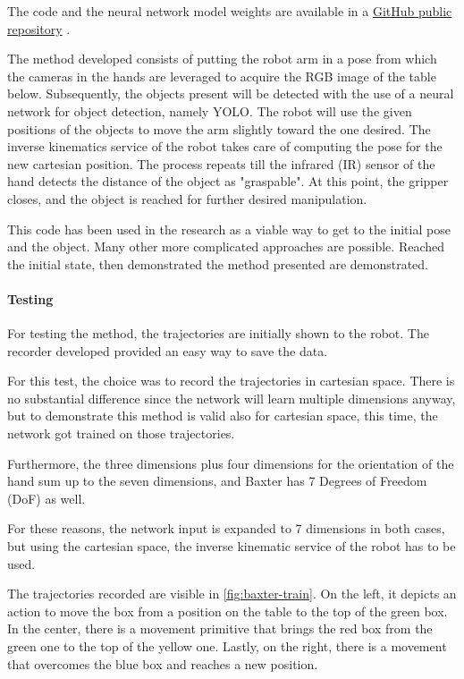 The code and the neural network model weights are available in a \href{https://github.com/igor-lirussi/Baxter-Robot-ObjDet}{GitHub public repository} \cite{url:BaxterrepoObjDet}.

The method developed consists of putting the robot arm in a pose from which the cameras in the hands are leveraged to acquire the RGB image of the table below. Subsequently, the objects present will be detected with the use of a neural network for object detection, namely YOLO. The robot will use the given positions of the objects to move the arm slightly toward the one desired. The inverse kinematics service of the robot takes care of computing the pose for the new cartesian position. The process repeats till the infrared (IR) sensor of the hand detects the distance of the object as "graspable". At this point, the gripper closes, and the object is reached for further desired manipulation.

This code has been used in the research as a viable way to get to the initial pose and the object. Many other more complicated approaches are possible. Reached the initial state, then demonstrated the method presented are demonstrated.   


\paragraph{Testing}
For testing the method, the trajectories are initially shown to the robot. The recorder developed provided an easy way to save the data. 

For this test, the choice was to record the trajectories in cartesian space. There is no substantial difference since the network will learn multiple dimensions anyway, but to demonstrate this method is valid also for cartesian space, this time, the network got trained on those trajectories. 

Furthermore, the three dimensions plus four dimensions for the orientation of the hand sum up to the seven dimensions, and Baxter has 7 Degrees of Freedom (DoF) as well. 

For these reasons, the network input is expanded to 7 dimensions in both cases, but using the cartesian space, the inverse kinematic service of the robot has to be used. 

The trajectories recorded are visible in \cref{fig:baxter-train}. On the left, it depicts an action to move the box from a position on the table to the top of the green box. In the center, there is a movement primitive that brings the red box from the green one to the top of the yellow one. Lastly, on the right, there is a movement that overcomes the blue box and reaches a new position. 

